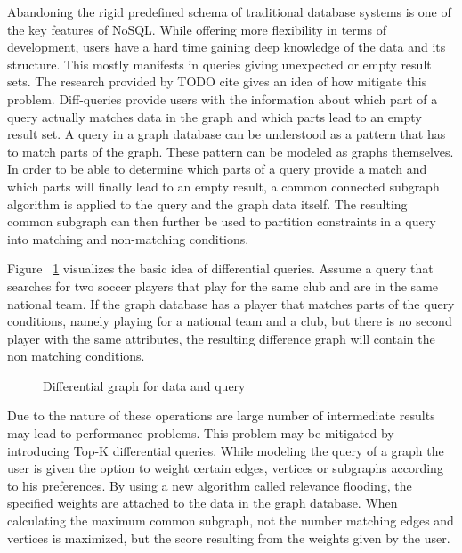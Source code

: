 \documentclass{sig-alternate}
\begin{document}
Abandoning the rigid predefined schema of traditional database systems is one of the 
key features of NoSQL. While offering more flexibility in terms of development,
users have a hard time gaining deep knowledge of the data and its structure.
This mostly manifests in queries giving unexpected or empty result sets.
The research provided by TODO cite gives an idea of how mitigate this problem.
Diff-queries provide users with the information about which part of a query actually
matches data in the graph and which parts lead to an empty result set.
A query in a graph database can be understood as a pattern that has to match parts of the graph.
These pattern can be modeled as graphs themselves. 
In order to be able to determine which parts of a query provide a match
and which parts will finally lead to an empty result, a common connected subgraph algorithm is
applied to the query and the graph data itself.
The resulting common subgraph can then further be used to partition 
constraints in a query into matching and non-matching conditions.

Figure ~\ref{fig:diffquery} visualizes the basic idea of
differential queries. Assume a query that searches for two soccer 
players that play for the same club and are in the same national team.
If the graph database has a player that matches parts of the query conditions,
namely playing for a national team and a club, but there is no second player with the 
same attributes, the resulting difference graph will contain the non matching conditions.

\begin{figure}
\centering
{}
\caption{Differential graph for data and query}
\label{fig:diffquery}
\end{figure}


Due to the nature of these operations are large number of intermediate results 
may lead to performance problems.
This problem may be mitigated by introducing Top-K differential queries. 
While modeling the query of a graph the user is given the option to weight 
certain edges, vertices or subgraphs according to his preferences.
By using a new algorithm called relevance flooding, the specified weights are 
attached to the data in the graph database.
When calculating the maximum common subgraph, not the number matching edges and
vertices is maximized, but the score resulting from the weights given by the user.
\end{document}
